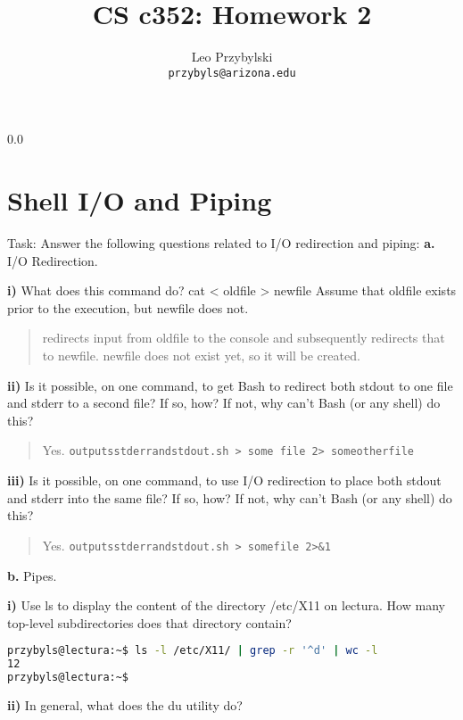 \documentclass[11pt,notitlepage]{article}
\title{CS c352: Homework 2}
\author{Leo Przybylski\\
\texttt{przybyls@arizona.edu}}
\newcommand{\question}[2]{\textbf{#1.} #2}
\newcommand{\subquestion}[2]{\par\hspace{0.5cm} \textbf{#1)} #2}
\begin{document}
  \maketitle
  {\setlength{\baselineskip}%
           {0.0\baselineskip}
  \section*{Shell I/O and Piping}
  \hrulefill \par}
Task: Answer the following questions related to I/O redirection and piping:
\question{a}{I/O Redirection.}
\subquestion{i}{What does this command do? cat < oldfile > newfile Assume that oldfile exists
prior to the execution, but newfile does not.}

\begin{quote}
  redirects input from oldfile to the console and subsequently
  redirects that to newfile. newfile does not exist yet, so it will be created.
\end{quote}

\subquestion{ii}{Is it possible, on one command, to get Bash to redirect both stdout to one ﬁle and stderr
to a second ﬁle? If so, how? If not, why can’t Bash (or any shell) do
this?}

\begin{quote}
  Yes. \verb|outputsstderrandstdout.sh > some file 2> someotherfile|
\end{quote}

\subquestion{iii}{Is it possible, on one command, to use I/O redirection to place both stdout and stderr into
the same ﬁle? If so, how? If not, why can’t Bash (or any shell) do
this?}

\begin{quote}
  Yes. \verb|outputsstderrandstdout.sh > somefile 2>&1|
\end{quote}

\question{b}{Pipes.}
\subquestion{i}{Use ls to display the content of the directory /etc/X11 on lectura. How many top-level
subdirectories does that directory contain?}

\begin{lstlisting}[language=bash,basicstyle=\scriptsize,backgroundcolor=\color{ubergray},caption={trnapp-config.xml},frame=single,breaklines=true]
przybyls@lectura:~$ ls -l /etc/X11/ | grep -r '^d' | wc -l
12
przybyls@lectura:~$
\end{lstlisting}

\subquestion{ii}{In general, what does the du utility do?}
\end{document}
